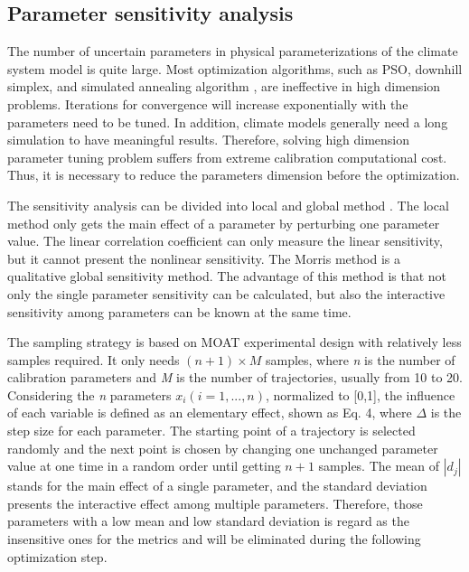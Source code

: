 \documentclass[gmd, manuscript]{copernicus}
\begin{document}
\subsection{Parameter sensitivity analysis}

The number of uncertain parameters in physical parameterizations of the climate system model is quite large. Most optimization algorithms, such as PSO, downhill simplex, and simulated annealing algorithm \citep{van1987simulated}, are ineffective in high dimension problems. Iterations for convergence will increase exponentially with the parameters need to be tuned.  In addition, climate models generally need a long simulation to have meaningful results. Therefore, solving high dimension parameter tuning problem suffers from extreme calibration computational cost.  Thus, it is necessary to reduce the parameters dimension before the optimization.

The sensitivity analysis can be divided into local and global method \citep{gan2014comprehensive}. The local method only gets the main effect of a parameter by perturbing one parameter value. The linear correlation coefficient can only measure the linear sensitivity, but it cannot present the nonlinear sensitivity. The Morris method \citep{morris1991factorial, campolongo2007effective} is a qualitative global sensitivity method. The advantage of this method is that not only the single parameter sensitivity can be calculated, but also the interactive sensitivity among parameters can be known at the same time.


The sampling strategy is based on MOAT experimental design with relatively less samples required. It only needs $(n+1) \times M$ samples, where \textit{n} is the number of calibration parameters and \textit{M} is the number of trajectories, usually from 10 to 20. Considering the \textit{n} parameters $x_i (i=1,...,n)$, normalized to [0,1], the influence of each variable is defined as an elementary effect, shown as Eq. 4, where $\Delta$ is the step size for each parameter. The starting point of a trajectory is selected randomly and the next point is chosen by changing one unchanged parameter value at one time in a random order until getting $n+1$ samples. The mean of $|d_j|$ stands for the main effect of a single parameter, and the standard deviation presents the interactive effect among multiple parameters. Therefore, those parameters with a low mean and low standard deviation is regard as the insensitive ones for the metrics and will be eliminated during the following optimization step.
\end{document}
